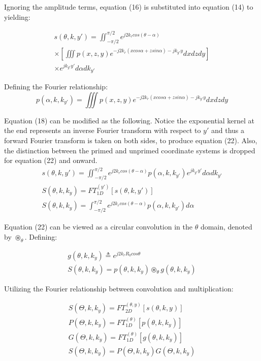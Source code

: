 \documentclass{IEEEtran}
\begin{document}
Ignoring the amplitude terms, equation (16) is substituted into equation (14) to yielding:

\begin{multline}
	s(\theta,k,y') = \iint_{-\pi/2}^{\pi/2} e^{j2k_r cos(\theta-\alpha)} \\ \times \left[\iiint p(x,z,y) e^{-j2k_r(xcos\alpha + zsin\alpha)-jk_{y'}y}dxdzdy\right] \\ \times e^{jk_{y'}y'}d\alpha dk_{y'}
\end{multline}

Defining the Fourier relationship:
\begin{equation}
	p(\alpha,k,k_{y'}) = \iiint p(x,z,y) e^{-j2k_r(xcos\alpha + zsin\alpha)-jk_{y'}y}dxdzdy
\end{equation}

Equation (18) can be modified as the following. Notice the exponential kernel at the end represents an inverse Fourier transform with respect to $y'$ and thus a forward Fourier transform is taken on both sides, to produce equation (22). Also, the distinction between the primed and unprimed coordinate systems is dropped for equation (22) and onward.
\begin{gather}
	s(\theta,k,y') = \iint_{-\pi/2}^{\pi/2} e^{j2k_r cos(\theta-\alpha)} p(\alpha,k,k_{y'})  e^{jk_{y'}y'}d\alpha dk_{y'} \\
	S(\theta,k,k_y) = FT_{1D}^{(y')}[s(\theta,k,y')] \\
	S(\theta,k,k_y) = \int_{-\pi/2}^{\pi/2} e^{j2k_r cos(\theta-\alpha)} p(\alpha,k,k_{y'})d\alpha 
\end{gather}

Equation (22) can be viewed as a circular convolution in the $\theta$ domain, denoted by $\circledast_{\theta}$. Defining:

\begin{gather}
	g(\theta,k,k_y) \triangleq e^{j2k_rR_0cos\theta} \\
	S(\theta,k,k_y) = p(\theta,k,k_y) \circledast_{\theta} g(\theta,k,k_y)
\end{gather}

Utilizing the Fourier relationship between convolution and multiplication:

\begin{gather}
	S(\Theta,k,k_y) = FT_{2D}^{(\theta,y)}[s(\theta,k,y)] \\
	P(\Theta,k,k_y) = FT_{1D}^{(\theta)}[p(\theta,k,k_y)] \\
	G(\Theta,k,k_y) = FT_{1D}^{(\theta)}[g(\theta,k,k_y)] \\
	S(\Theta,k,k_y) = P(\Theta,k,k_y) G(\Theta,k,k_y)
\end{gather}
\end{document}
